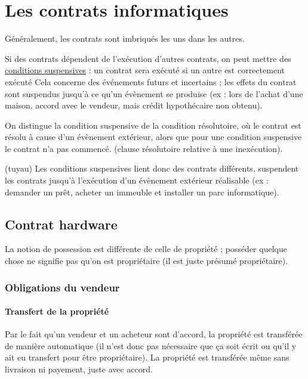 \chapter{Les contrats informatiques}
	
Généralement, les contrats sont imbriqués les uns dans les autres.

Si des contrats dépendent de l'exécution d'autres contrats, on peut mettre des \underline{conditions suspensives} : un contrat sera exécuté si un autre est correctement exécuté  Cela concerne des événements futurs et incertains ; les effets du contrat sont suspendus jusqu'à ce qu'un évènement se produise (ex : lors de l'achat d'une maison, accord avec le vendeur, mais crédit hypothécaire non obtenu).

On distingue la condition suspensive de la condition résolutoire, où le contrat est résolu à cause d'un évènement extérieur, alors que pour une condition suspensive le contrat n'a pas commencé. (clause résolutoire relative à une inexécution).


(tuyau) Les conditions suspensives lient donc des contrats différents, suspendent les contrats jusqu'à l'exécution d'un évènement extérieur réalisable (ex : demander un prêt, acheter un immeuble et installer un parc informatique).


	\section{Contrat hardware}
	
	La notion de possession est différente de celle de propriété ; posséder quelque chose ne signifie pas qu'on est propriétaire (il est juste présumé propriétaire).
	
	
		\subsection{Obligations du  vendeur}
	
			\subsubsection{Transfert de la propriété}
			
			Par le fait qu'un vendeur et un acheteur sont d'accord, la propriété est transférée de manière automatique (il n'est donc pas nécessaire que ça soit écrit ou qu'il y ait eu transfert pour être propriétaire). La propriété est transférée même sans livraison ni payement, juste avec accord. 
		
